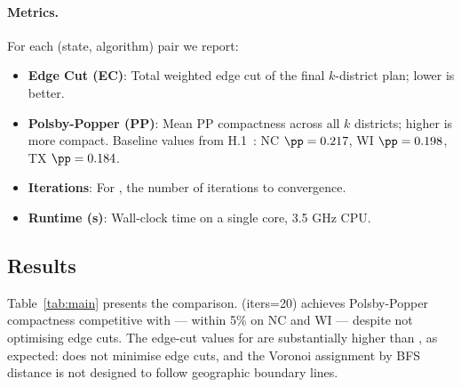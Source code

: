 \paragraph{Metrics.}
For each (state, algorithm) pair we report:
\begin{itemize}
\item \textbf{Edge Cut (EC)}: Total weighted edge cut of the final $k$-district
  plan; lower is better.
\item \textbf{Polsby-Popper (PP)}: Mean PP compactness across all $k$ districts;
  higher is more compact.
  Baseline values from H.1~\citep{h1paper}: NC $\pp = 0.217$, WI $\pp = 0.198$,
  TX $\pp = 0.184$.
\item \textbf{Iterations}: For \cvd{}, the number of iterations to convergence.
\item \textbf{Runtime (s)}: Wall-clock time on a single core, 3.5 GHz CPU.
\end{itemize}

\subsection{Results}

Table~\ref{tab:main} presents the comparison.
\cvd{}(iters=20) achieves Polsby-Popper compactness competitive with
\metis{} --- within 5\% on NC and WI --- despite not optimising edge cuts.
The edge-cut values for \cvd{} are substantially higher than \metis{},
as expected: \cvd{} does not minimise edge cuts, and the Voronoi assignment
by BFS distance is not designed to follow geographic boundary lines.

